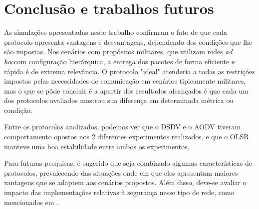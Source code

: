 \section{Conclus\~ao e trabalhos futuros}\label{conclusao}

As simula\c{c}\~oes apresentadas neste trabalho confirmam o fato de que cada protocolo apresenta vantagens e desvantagens, dependendo dos condi\c{c}\~oes que lhe s\~ao impostas. 
Nos cen\'arios com prop\'ositos militares, que utilizam redes \textit{ad hoc}com configura\c{c}\~ao hier\'arquica, a entrega dos pacotes de forma eficiente e r\'apida \'e de extrema relev\^ancia. 
O protocolo "ideal" atenderia a todas as restri\c{c}\~oes impostas pelas necessidades de comunica\c{c}\~ao em cen\'arios tipicamente militares, mas o que se p\^ode concluir \'e a apartir dos resultados alcan\c{c}ados \'e que cada um dos protocolos avaliados mostrou sua diferen\c{c}a em determinada m\'etrica ou condi\c{c}\~ao.

Entre os protocolos analizados, podemos ver que o DSDV e o AODV tiveram comportamento opostos nos 2 diferentes experimentos realizados, e que o OLSR manteve uma boa estabilidade entre ambos os experimentos.

Para futuras pesquisas, \'e sugerido que seja combinado algumas caracter\'isticas de protocolos, prevalecendo das situa\c{c}\~oes onde em que eles apresentam maiores vantagens que se adaptem aos cen\'arios propostos. Al\'em disso, deve-se avaliar o impacto das implementa\c{c}\~oes relativas \`a seguran\c{c}a nesse tipo de rede, como mencionados em \cite{salles}.


